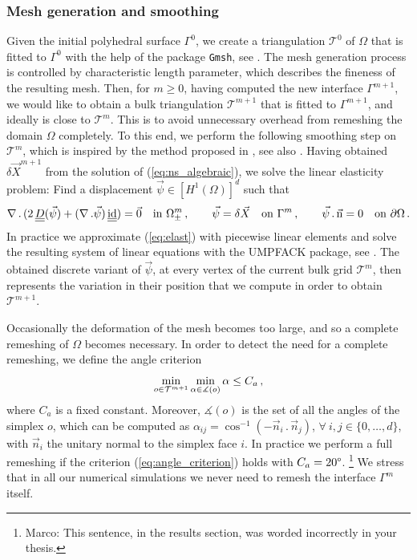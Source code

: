 \documentclass[a4paper,12pt,onecolumn]{article}
\newcommand{\sigmaO}{o}
\newcommand{\id}{\rm id}
\newcommand{\unitn}{\vec{\rm n}}
\newcommand{\mat}[1]{\underline{\underline{#1}}\rule{0pt}{0pt}}
\begin{document}
\subsubsection{Mesh generation and smoothing}\label{sec:smoothing}
Given the initial polyhedral surface $\Gamma^0$, we create a triangulation
$\mathcal{T}^0$ of $\Omega$ that is fitted to $\Gamma^0$ with the help of the
package \verb|Gmsh|, see \cite{GeuzaineR09}.
The mesh generation process is controlled by characteristic length
parameter, which describes the fineness of the resulting mesh.
Then, for $m \geq 0$, having computed the new interface $\Gamma^{m+1}$, we
would like to obtain a bulk triangulation $\mathcal{T}^{m+1}$ that is fitted to
$\Gamma^{m+1}$, and ideally is close to $\mathcal{T}^m$. This is to avoid
unnecessary overhead from remeshing the domain $\Omega$ completely.
To this end, we perform the following smoothing step on $\mathcal{T}^m$, which
is inspired by the method proposed in \cite{Ganesan06}, see also
\cite{GanesanT08}. Having obtained $\delta \vec X^{m+1}$ from the solution of
(\ref{eq:ns_algebraic}), we solve the linear elasticity problem: Find a
displacement $\vec\psi \in [H^1(\Omega)]^d$ such that
\begin{equation}
\nabla\,.\,(2\,\mat D(\vec\psi) + (\nabla\,.\vec\psi)\,\mat\id)
= \vec 0 \quad \mbox{in } \Omega_\pm^m\,,\qquad
\vec\psi = \delta \vec X \quad \mbox{on } \Gamma^m\,, \qquad
\vec\psi\,.\,\unitn = 0 \quad \mbox{on } \partial\Omega\,.
\label{eq:elast}
\end{equation}
In practice we approximate (\ref{eq:elast})
with piecewise linear elements and solve the resulting system of linear
equations with the UMPFACK package, see \cite{Davis04}. The obtained discrete
variant of $\vec\psi$, at every vertex of the current bulk grid
$\mathcal{T}^m$, then represents the variation in their position that we
compute in order to obtain $\mathcal{T}^{m+1}$.

Occasionally the deformation of the mesh becomes too large, and so a
complete remeshing of $\Omega$ becomes necessary. In order to detect the need
for a complete remeshing, we define the angle criterion
\begin{equation}\label{eq:angle_criterion}
\min_{\sigmaO\in {\cal T}^{m+1}}\min_{\alpha\in \measuredangle(\sigmaO)}\alpha
\leq C_a\,,
\end{equation}
where $C_a$ is a fixed constant. Moreover, $\measuredangle(\sigmaO)$ is the set
of all the angles of the simplex $\sigmaO$, which can be computed as
$\alpha_{ij}=\cos^{-1}(-\vec n_i\,.\,\vec n_j)$, $\forall\ i,j\in\{0,\dots,d\}$,
with $\vec n_i$ the unitary normal to the simplex face $i$.
In practice we perform a full remeshing if the
criterion (\ref{eq:angle_criterion}) holds with $C_a=20\degree$.
\footnote{Marco: This sentence, in the results section, was worded incorrectly
in your thesis.}
We stress that in all our numerical simulations we never need to remesh the
interface $\Gamma^m$ itself.
\end{document}
